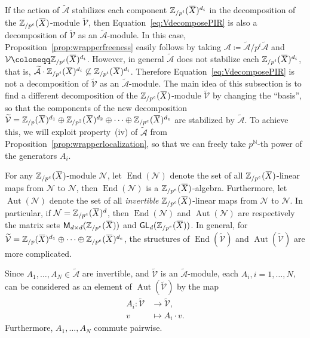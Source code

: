 \documentclass[letterpaper, 11pt, thm-restate]{article}
\numberwithin{equation}{section}
\newcommand{\N}{\mathbb{N}}
\newcommand{\Zpe}{\mathbb{Z}_{/p^e}}
\newcommand{\Zp}{\mathbb{Z}_{/p}}
\newcommand{\Zpt}{\mathbb{Z}_{/p^2}}
\newcommand{\Zpi}{\mathbb{Z}_{/p^i}}
\newcommand{\GL}{\mathsf{GL}}
\newcommand{\Aut}{\operatorname{Aut}}
\newcommand{\End}{\operatorname{End}}
\newcommand{\id}{\operatorname{id}}
\newcommand{\mN}{\mathcal{N}}
\newcommand{\mV}{\mathcal{V}}
\newcommand{\M}{\mathsf{M}}
\newcommand{\mA}{\mathcal{A}}
\newcommand{\tmA}{\widetilde{\mathcal{A}}}
\newcommand{\tmV}{\widetilde{\mathcal{V}}}
\newcommand{\oX}{\mkern 1.5mu\overline{\mkern-1.5mu X \mkern-1.5mu}\mkern 1.5mu}
\theoremstyle{definition}
\theoremstyle{definition}
\theoremstyle{definition}
\begin{document}
If the action of $\tmA$ stabilizes each component $\Zpi(\oX)^{d_i}$ in the decomposition of the $\Zpe(\oX)$-module $\tmV$, then Equation~\eqref{eq:VdecomposePIR} is also a decomposition of $\tmV$ as an $\tmA$-module.
In this case, Proposition~\ref{prop:wrapperfreeness} easily follows by taking $\mA \coloneqq \tmA/p^i\tmA$ and $\mV \coloneqq \Zpi(\oX)^{d_i}$.
However, in general $\tmA$ does not stabilize each $\Zpi(\oX)^{d_i}$, that is, $\tmA \cdot \Zpi(\oX)^{d_i} \not\subseteq \Zpi(\oX)^{d_i}$.
Therefore Equation~\eqref{eq:VdecomposePIR} is not a decomposition of $\tmV$ as an $\tmA$-module.
The main idea of this subsection is to find a different decomposition of the $\Zpe(\oX)$-module $\tmV$ by changing the ``basis'', so that the components of the new decomposition $\tmV = \Zp(\oX)^{d_1} \oplus \Zpt(\oX)^{d_2} \oplus \cdots \oplus \Zpe(\oX)^{d_e}$ are stabilized by $\tmA$.
To achieve this, we will exploit property~(iv) of $\tmA$ from Proposition~\ref{prop:wrapperlocalization}, so that we can freely take $p^{\N}$-th power of the generators $A_i$.

For any $\Zpe(\oX)$-module $\mN$, let $\End(\mN)$ denote the set of all $\Zpe(\oX)$-linear maps from $\mN$ to $\mN$, then $\End(\mN)$ is a $\Zpe(\oX)$-algebra.
Furthermore, let $\Aut(\mN)$ denote the set of all \emph{invertible} $\Zpe(\oX)$-linear maps from $\mN$ to $\mN$.
In particular, if $\mN = \Zpe(\oX)^d$, then $\End(\mN)$ and $\Aut(\mN)$ are respectively the matrix sets $\M_{d \times d}(\Zpe(\oX))$ and $\GL_{d}(\Zpe(\oX))$.
In general, for $\tmV = \Zp(\oX)^{d_1} \oplus \cdots \oplus \Zpe(\oX)^{d_e}$, the structures of $\End(\tmV)$ and $\Aut(\tmV)$ are more complicated.

Since $A_1, \ldots, A_N \in \tmA$ are invertible, and $\tmV$ is an $\tmA$-module, each $A_i, i = 1, \ldots, N$, can be considered as an element of $\Aut(\tmV)$ by the map
\begin{align*}
    A_i \colon \tmV & \rightarrow \tmV, \\
    v & \mapsto A_i \cdot v.
\end{align*}
Furthermore, $A_1, \ldots, A_N$ commute pairwise. 
\end{document}
